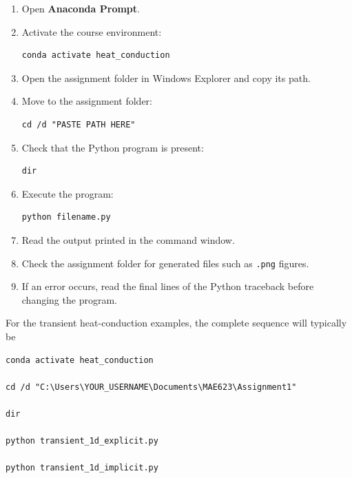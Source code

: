 \documentclass[11pt]{article}
\begin{document}
\begin{enumerate}

    \item Open \textbf{Anaconda Prompt}.

    \item Activate the course environment:

\begin{lstlisting}
conda activate heat_conduction
\end{lstlisting}

    \item Open the assignment folder in Windows Explorer and copy its
          path.

    \item Move to the assignment folder:

\begin{lstlisting}
cd /d "PASTE PATH HERE"
\end{lstlisting}

    \item Check that the Python program is present:

\begin{lstlisting}
dir
\end{lstlisting}

    \item Execute the program:

\begin{lstlisting}
python filename.py
\end{lstlisting}

    \item Read the output printed in the command window.

    \item Check the assignment folder for generated files such as
          \texttt{.png} figures.

    \item If an error occurs, read the final lines of the Python
          traceback before changing the program.

\end{enumerate}

For the transient heat-conduction examples, the complete sequence will
typically be

\begin{lstlisting}
conda activate heat_conduction

cd /d "C:\Users\YOUR_USERNAME\Documents\MAE623\Assignment1"

dir

python transient_1d_explicit.py

python transient_1d_implicit.py
\end{lstlisting}
\end{document}
